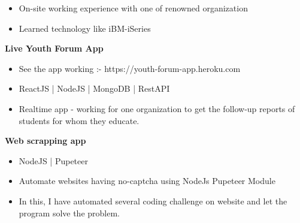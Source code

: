\documentclass[10pt,a4paper,ragged2e,withhyper]{altacv}
\begin{document}
\begin{paracol}{2}


\begin{itemize}
\item On-site working experience with one of renowned organization
\item Learned technology like iBM-iSeries
\end{itemize}

\divider



\divider


\textbf{Live Youth Forum App}\\\vspace{0.9mm}
	\begin{itemize}[leftmargin=*, noitemsep]
	\item See the app working :-  https://youth-forum-app.heroku.com
	\item ReactJS | NodeJS | MongoDB | RestAPI
	\item Realtime app - working for one organization to get the follow-up reports of students for whom they educate.
	\end{itemize}
	
\divider

\textbf{Web scrapping app}\\\vspace{0.9mm}
	\begin{itemize}[leftmargin=*, noitemsep]
	\item NodeJS | Pupeteer
	\item Automate websites having no-captcha using NodeJs Pupeteer Module
	\item In this, I have automated several coding challenge on website and let the program solve the problem.
	\end{itemize}
	

\end{paracol}
\end{document}
